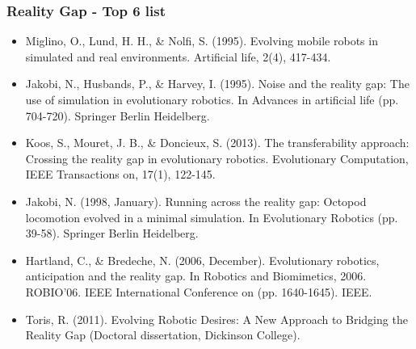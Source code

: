 \documentclass[8pt]{beamer}
\begin{document}
\begin{frame}
\frametitle{Reality Gap - Top 6 list}
\begin{itemize}
	\item Miglino, O., Lund, H. H., \& Nolfi, S. (1995). Evolving mobile robots in simulated and real environments. Artificial life, 2(4), 417-434.
	\item Jakobi, N., Husbands, P., \& Harvey, I. (1995). Noise and the reality gap: The use of simulation in evolutionary robotics. In Advances in artificial life (pp. 704-720). Springer Berlin Heidelberg.
	\item Koos, S., Mouret, J. B., \& Doncieux, S. (2013). The transferability approach: Crossing the reality gap in evolutionary robotics. Evolutionary Computation, IEEE Transactions on, 17(1), 122-145.
	\item Jakobi, N. (1998, January). Running across the reality gap: Octopod locomotion evolved in a minimal simulation. In Evolutionary Robotics (pp. 39-58). Springer Berlin Heidelberg.
	\item Hartland, C., \& Bredeche, N. (2006, December). Evolutionary robotics, anticipation and the reality gap. In Robotics and Biomimetics, 2006. ROBIO'06. IEEE International Conference on (pp. 1640-1645). IEEE.
	\item Toris, R. (2011). Evolving Robotic Desires: A New Approach to Bridging the Reality Gap (Doctoral dissertation, Dickinson College).
\end{itemize}
\end{frame}
\end{document}
